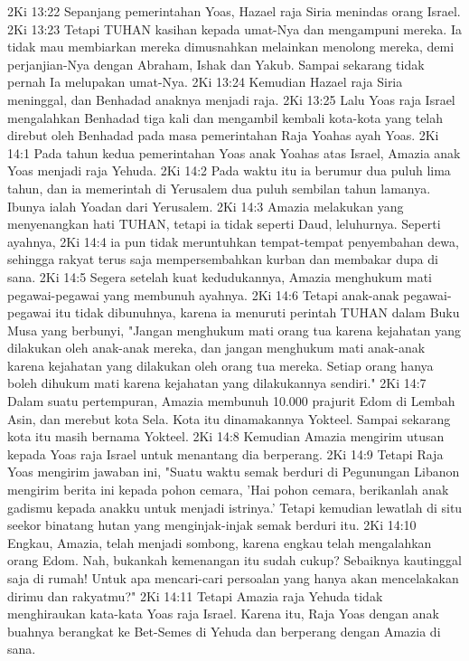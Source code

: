 2Ki 13:22  Sepanjang pemerintahan Yoas, Hazael raja Siria menindas orang Israel.
2Ki 13:23  Tetapi TUHAN kasihan kepada umat-Nya dan mengampuni mereka. Ia tidak mau membiarkan mereka dimusnahkan melainkan menolong mereka, demi perjanjian-Nya dengan Abraham, Ishak dan Yakub. Sampai sekarang tidak pernah Ia melupakan umat-Nya.
2Ki 13:24  Kemudian Hazael raja Siria meninggal, dan Benhadad anaknya menjadi raja.
2Ki 13:25  Lalu Yoas raja Israel mengalahkan Benhadad tiga kali dan mengambil kembali kota-kota yang telah direbut oleh Benhadad pada masa pemerintahan Raja Yoahas ayah Yoas.
2Ki 14:1  Pada tahun kedua pemerintahan Yoas anak Yoahas atas Israel, Amazia anak Yoas menjadi raja Yehuda.
2Ki 14:2  Pada waktu itu ia berumur dua puluh lima tahun, dan ia memerintah di Yerusalem dua puluh sembilan tahun lamanya. Ibunya ialah Yoadan dari Yerusalem.
2Ki 14:3  Amazia melakukan yang menyenangkan hati TUHAN, tetapi ia tidak seperti Daud, leluhurnya. Seperti ayahnya,
2Ki 14:4  ia pun tidak meruntuhkan tempat-tempat penyembahan dewa, sehingga rakyat terus saja mempersembahkan kurban dan membakar dupa di sana.
2Ki 14:5  Segera setelah kuat kedudukannya, Amazia menghukum mati pegawai-pegawai yang membunuh ayahnya.
2Ki 14:6  Tetapi anak-anak pegawai-pegawai itu tidak dibunuhnya, karena ia menuruti perintah TUHAN dalam Buku Musa yang berbunyi, "Jangan menghukum mati orang tua karena kejahatan yang dilakukan oleh anak-anak mereka, dan jangan menghukum mati anak-anak karena kejahatan yang dilakukan oleh orang tua mereka. Setiap orang hanya boleh dihukum mati karena kejahatan yang dilakukannya sendiri."
2Ki 14:7  Dalam suatu pertempuran, Amazia membunuh 10.000 prajurit Edom di Lembah Asin, dan merebut kota Sela. Kota itu dinamakannya Yokteel. Sampai sekarang kota itu masih bernama Yokteel.
2Ki 14:8  Kemudian Amazia mengirim utusan kepada Yoas raja Israel untuk menantang dia berperang.
2Ki 14:9  Tetapi Raja Yoas mengirim jawaban ini, "Suatu waktu semak berduri di Pegunungan Libanon mengirim berita ini kepada pohon cemara, 'Hai pohon cemara, berikanlah anak gadismu kepada anakku untuk menjadi istrinya.' Tetapi kemudian lewatlah di situ seekor binatang hutan yang menginjak-injak semak berduri itu.
2Ki 14:10  Engkau, Amazia, telah menjadi sombong, karena engkau telah mengalahkan orang Edom. Nah, bukankah kemenangan itu sudah cukup? Sebaiknya kautinggal saja di rumah! Untuk apa mencari-cari persoalan yang hanya akan mencelakakan dirimu dan rakyatmu?"
2Ki 14:11  Tetapi Amazia raja Yehuda tidak menghiraukan kata-kata Yoas raja Israel. Karena itu, Raja Yoas dengan anak buahnya berangkat ke Bet-Semes di Yehuda dan berperang dengan Amazia di sana.
